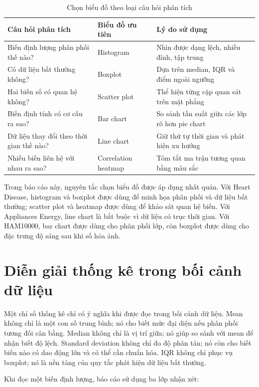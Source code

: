 \begin{table}[H]
\centering
\caption{Chọn biểu đồ theo loại câu hỏi phân tích}
\label{tab:chapter1_chart_by_question}
\small
\begin{tabular}{p{}p{}p{}}
\toprule
Câu hỏi phân tích & Biểu đồ ưu tiên & Lý do sử dụng \\
\midrule
Biến định lượng phân phối thế nào? & Histogram & Nhìn được dạng lệch, nhiều đỉnh, tập trung \\
Có dữ liệu bất thường không? & Boxplot & Dựa trên median, IQR và điểm ngoài ngưỡng \\
Hai biến số có quan hệ không? & Scatter plot & Thể hiện từng cặp quan sát trên mặt phẳng \\
Biến định tính có cơ cấu ra sao? & Bar chart & So sánh tần suất giữa các lớp rõ hơn pie chart \\
Dữ liệu thay đổi theo thời gian thế nào? & Line chart & Giữ thứ tự thời gian và phát hiện xu hướng \\
Nhiều biến liên hệ với nhau ra sao? & Correlation heatmap & Tóm tắt ma trận tương quan bằng màu sắc \\
\bottomrule
\end{tabular}
\end{table}

Trong báo cáo này, nguyên tắc chọn biểu đồ được áp dụng nhất quán. Với Heart Disease, histogram và boxplot được dùng để minh họa phân phối và dữ liệu bất thường; scatter plot và heatmap được dùng để khảo sát quan hệ biến. Với Appliances Energy, line chart là bắt buộc vì dữ liệu có trục thời gian. Với HAM10000, bar chart được dùng cho phân phối lớp, còn boxplot được dùng cho đặc trưng độ sáng sau khi số hóa ảnh.

\section{Diễn giải thống kê trong bối cảnh dữ liệu}

Một chỉ số thống kê chỉ có ý nghĩa khi được đọc trong bối cảnh dữ liệu. Mean không chỉ là một con số trung bình; nó cho biết mức đại diện nếu phân phối tương đối cân bằng. Median không chỉ là vị trí giữa; nó giúp so sánh với mean để nhận biết độ lệch. Standard deviation không chỉ đo độ phân tán; nó còn cho biết biến nào có dao động lớn và có thể cần chuẩn hóa. IQR không chỉ phục vụ boxplot; nó là nền tảng của quy tắc phát hiện dữ liệu bất thường.

Khi đọc một biến định lượng, báo cáo sử dụng ba lớp nhận xét:

